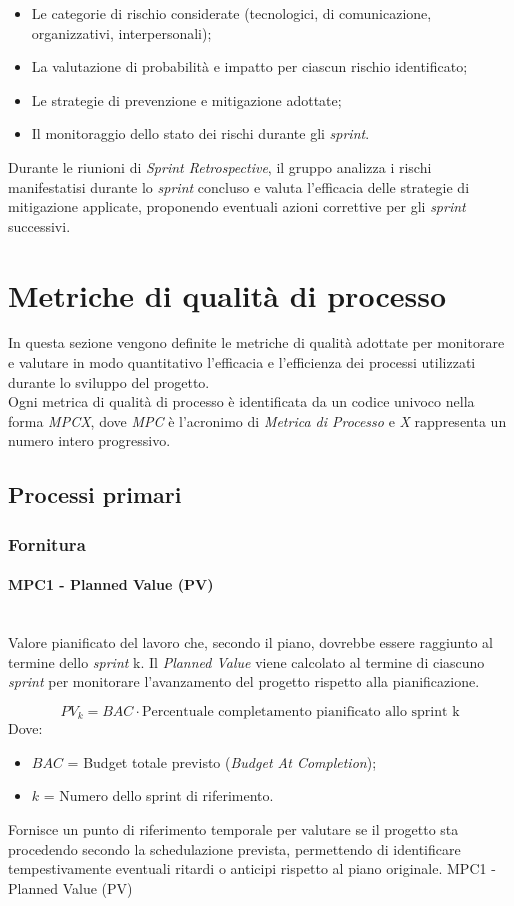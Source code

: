\documentclass[10pt, letterpaper]{article}
\newcommand{\trisubsection}[1]{\paragraph{#1}\mbox{}\\}
\begin{document}
\begin{itemize}
    \item Le categorie di rischio considerate (tecnologici, di comunicazione, organizzativi, interpersonali);
    \item La valutazione di probabilità e impatto per ciascun rischio identificato;
    \item Le strategie di prevenzione e mitigazione adottate;
    \item Il monitoraggio dello stato dei rischi durante gli \textit{sprint}.
\end{itemize}

Durante le riunioni di \textit{Sprint Retrospective}, il gruppo analizza i rischi manifestatisi durante lo \textit{sprint} concluso e valuta l'efficacia delle strategie di mitigazione applicate, proponendo eventuali azioni correttive per gli \textit{sprint} successivi.



\section{Metriche di qualità di processo}
\label{sec:MetricheProcesso}
In questa sezione vengono definite le metriche di qualità adottate per monitorare
e valutare in modo quantitativo l'efficacia e l'efficienza dei processi utilizzati
durante lo sviluppo del progetto.
\\ Ogni metrica di qualità di processo è identificata
da un codice univoco nella forma \textit{MPCX}, dove \textit{MPC} è l'acronimo di \textit{Metrica di Processo} e \textit{X} rappresenta
un numero intero progressivo.

\subsection{Processi primari}

\subsubsection{Fornitura}

\trisubsection{MPC1 - Planned Value (PV)}
\label{sec:MPC1}
{Valore pianificato del lavoro che, secondo il piano,
    dovrebbe essere raggiunto al termine dello \textit{sprint} k.
    Il \textit{Planned Value} viene calcolato al termine di ciascuno \textit{sprint} per monitorare
    l'avanzamento del progetto rispetto alla pianificazione.}
{\[ PV_k = BAC \cdot \mbox{Percentuale completamento pianificato allo sprint k} \] Dove:
    \begin{itemize}
        \item $BAC$ = Budget totale previsto (\textit{Budget At Completion});
        \item $k$ = Numero dello sprint di riferimento.
    \end{itemize}
}
{Fornisce un punto di riferimento temporale per
    valutare se il progetto sta procedendo secondo la schedulazione prevista,
    permettendo di identificare tempestivamente eventuali ritardi o anticipi
    rispetto al piano originale.}
{MPC1 - Planned Value (PV)}
\end{document}
